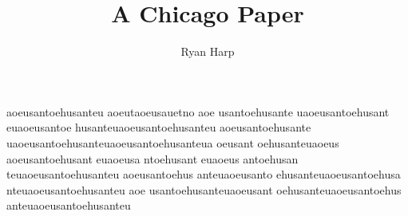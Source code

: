 \documentclass[a4paper]{article}
\begin{document}
\title{A Chicago Paper}
\author{Ryan Harp}
\maketitle
\newpage

aoeusantoehusanteu\autocite{Ful83}
aoeutaoeusauetno\autocite{Ful83} 
aoe usantoehusante  uaoeusantoehusant euaoeusantoe husanteuaoeusantoehusanteu
aoeusantoehusante uaoeusantoehusanteuaoeusantoehusanteua
oeusant oehusanteuaoeus
aoeusantoehusant euaoeusa ntoehusant euaoeus antoehusan teuaoeusantoehusanteu
aoeusantoehus anteuaoeusanto ehusanteuaoeusantoehusa nteuaoeusantoehusanteu
aoe usantoehusanteuaoeusant oehusanteuaoeusantoehus anteuaoeusantoehusanteu
 
\end{document}
